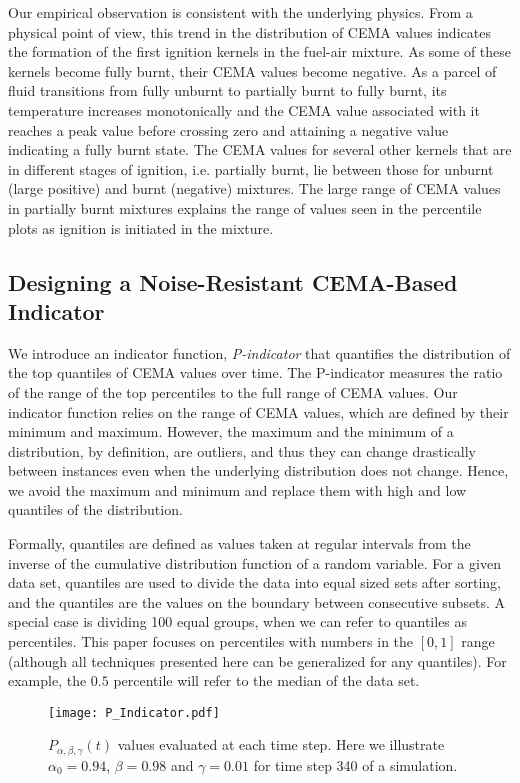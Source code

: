\documentclass[final]{siamltex}
\newcommand{\pmetric}{P}
\begin{document}
Our empirical observation is consistent with the underlying physics. From a physical 
point of view, this trend in the distribution of CEMA values indicates the formation of the first ignition kernels in the 
fuel-air mixture. As some of these kernels become fully burnt, their CEMA values 
become negative. As a parcel of fluid transitions from fully unburnt to partially 
burnt to fully burnt, its temperature increases monotonically and the CEMA value 
associated with it reaches a peak value before crossing zero and attaining a 
negative value indicating a fully burnt state. The CEMA values for several 
other kernels that are in different stages of ignition, i.e. partially burnt, 
lie between those for unburnt (large positive) and burnt (negative) mixtures. 
The large range of CEMA values in partially burnt mixtures explains the range 
of values seen in the percentile plots as ignition is initiated in the mixture.
\subsection{Designing a Noise-Resistant CEMA-Based Indicator} \label{sec:indicator}
We introduce an indicator function, \emph{\pmetric-indicator} that quantifies 
the distribution of the top quantiles of CEMA values over time. The
\pmetric-indicator measures the ratio of the range of the top percentiles  
to the full range of CEMA values. 
Our indicator function  relies on  the range of CEMA values,  which are 
defined by their minimum and maximum.  However, the maximum and the minimum of a 
distribution, by definition,  are outliers, and  thus they can change drastically  
between instances even when the underlying  distribution does not change.  Hence, 
we avoid the maximum and minimum and replace them with  high and low quantiles of 
the distribution. 

Formally, quantiles are defined as  values taken at regular intervals from the 
inverse of the cumulative distribution function of a random variable. For a given 
data set, quantiles are used to divide the data into equal sized sets  after sorting, 
and the quantiles are the values on the boundary between consecutive subsets.  A special 
case is dividing 100 equal groups, when we can refer to quantiles as
percentiles.  This paper focuses on percentiles with numbers in the $[0,1]$ 
range (although all techniques presented here can be generalized for any
quantiles). For example, the $0.5$ percentile will refer to the median of the data set. 
\begin{figure}[H]
\centering
\texttt{[image: P\_Indicator.pdf]}
\caption{\label{fig:p_indicator} 
  $\pmetric_{\alpha,\beta,\gamma}(t)$ values evaluated at each time step. 
  Here we illustrate $\alpha_0=0.94$, $\beta=0.98$ and $\gamma=0.01$ for
  time step 340 of a simulation.
}
\end{figure}
 
\end{document}
